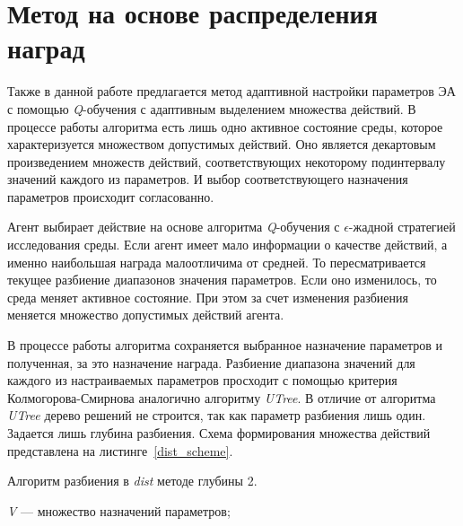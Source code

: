 \section{Метод на основе распределения наград}
\label{dist_method}

Также в данной работе предлагается метод адаптивной настройки параметров ЭА с помощью \textit{Q}-обучения с адаптивным выделением множества действий. В процессе работы алгоритма есть лишь одно активное состояние среды, которое характеризуется множеством допустимых действий. Оно является декартовым произведением множеств действий, соответствующих некоторому подинтервалу значений каждого из параметров. И выбор соответствующего назначения параметров происходит согласованно.

Агент выбирает действие на основе алгоритма \textit{Q}-обучения с $\epsilon$-жадной стратегией исследования среды. Если агент имеет мало информации о качестве действий, а именно наибольшая награда малоотличима от средней. То пересматривается текущее разбиение диапазонов значения параметров. Если оно изменилось, то среда меняет активное состояние. При этом за счет изменения разбиения меняется множество допустимых действий агента.

В процессе работы алгоритма сохраняется выбранное назначение параметров и полученная, за это назначение награда. Разбиение диапазона значений для каждого из настраиваемых параметров просходит с помощью критерия Колмогорова-Смирнова аналогично алгоритму \textit{UTree}. В отличие от алгоритма \textit{UTree} дерево решений не строится, так как параметр разбиения лишь один. Задается лишь глубина разбиения. Схема формирования множества действий представлена на листинге~\ref{dist_scheme}.


\begin{algorithm}[h!]
    \caption{Алгоритм разбиения в \textit{dist} методе глубины 2.}
    \label{dist_scheme}
    \begin{algorithmic}[1]
	\REQUIRE  
	  \textit{V} --- множество назначений параметров;
	  \ELSE
	      \STATE {$P \gets \{[v_{min}, s], (s, v_{max}]\}$}
	      \STATE {$P \gets \{[v_{min}, s], (s, s_r], (s_r, v_{max}]\}$}
	      \STATE {$P \gets \{[v_{min}, s_l], (s_l, s], (s, v_{max}]\}$}
	     \ELSE
	      \STATE {$P \gets \{[v_{min}, s_l], (s_l, s], (s, s_r], (s_r, v_{max}]\}$}
	    \ENDIF
	  \ENDIF
        \ENDFOR
    \end{algorithmic}
\end{algorithm}